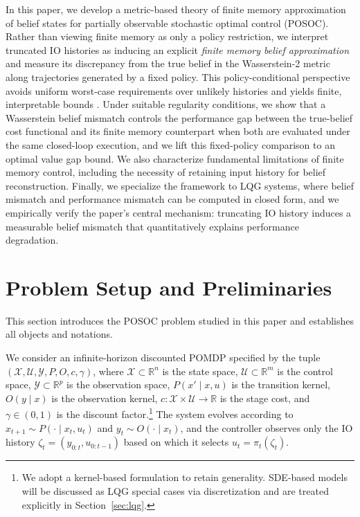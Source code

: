 \documentclass[letterpaper, 10 pt, conference]{ieeeconf}
\begin{document}
In this paper, we develop a metric-based theory of finite memory approximation of belief states for partially observable stochastic optimal control (POSOC).
Rather than viewing finite memory as only a policy restriction, we interpret truncated IO histories as inducing an explicit \emph{finite memory belief approximation} and measure its discrepancy from the true belief in the Wasserstein-2 metric along trajectories generated by a fixed policy.
This policy-conditional perspective avoids uniform worst-case requirements over unlikely histories and yields finite, interpretable bounds \cite{kara2022near}.
Under suitable regularity conditions, we show that a Wasserstein belief mismatch controls the performance gap between the true-belief cost functional and its finite memory counterpart when both are evaluated under the same closed-loop execution, and we lift this fixed-policy comparison to an optimal value gap bound.
We also characterize fundamental limitations of finite memory control, including the necessity of retaining input history for belief reconstruction.
Finally, we specialize the framework to LQG systems, where belief mismatch and performance mismatch can be computed in closed form, and we empirically verify the paper's central mechanism: truncating IO history induces a measurable belief mismatch that quantitatively explains performance degradation.




\section{Problem Setup and Preliminaries}
\label{sec:setup}

This section introduces the POSOC problem studied in this paper and establishes all objects and notations.

We consider an infinite-horizon discounted POMDP specified by the tuple $(\mathcal{X},\mathcal{U},\mathcal{Y},P,O,c,\gamma)$, where $\mathcal{X}\subset\mathbb{R}^n$ is the state space, $\mathcal{U}\subset\mathbb{R}^m$ is the control space, $\mathcal{Y}\subset\mathbb{R}^p$ is the observation space, $P(x' \mid x,u)$ is the transition kernel, $O(y \mid x)$ is the observation kernel, $c:\mathcal{X}\times\mathcal{U}\to\mathbb{R}$ is the stage cost, and $\gamma\in(0,1)$ is the discount factor.\footnote{We adopt a kernel-based formulation to retain generality. SDE-based models will be discussed as LQG special cases via discretization and are treated explicitly in Section~\ref{sec:lqg}.}
The system evolves according to $x_{t+1}\sim P(\cdot\mid x_t,u_t)$ and $y_t\sim O(\cdot\mid x_t)$, and the controller observes only the IO history $\zeta_t=(y_{0:t},u_{0:t-1})$ based on which it selects $u_t=\pi_t(\zeta_t)$.
\end{document}
